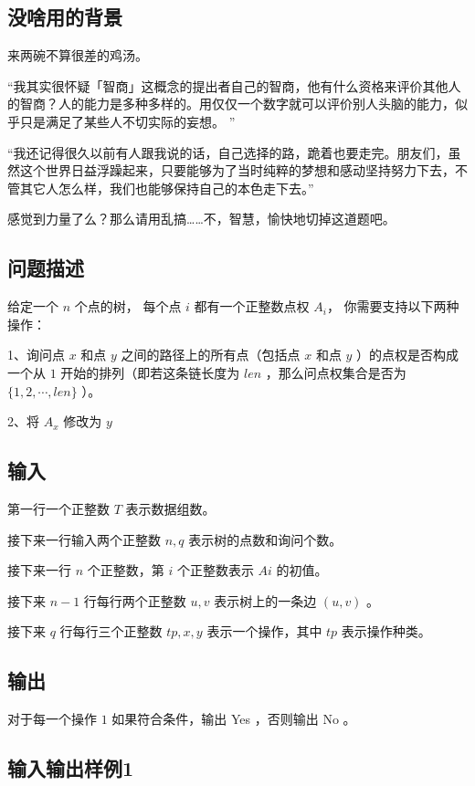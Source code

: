 \documentclass[UTF8]{ctexart}
\begin{document}
\subsection{没啥用的背景}

来两碗不算很差的鸡汤。

“我其实很怀疑「智商」这概念的提出者自己的智商，他有什么资格来评价其他人的智商？人的能力是多种多样的。用仅仅一个数字就可以评价别人头脑的能力，似乎只是满足了某些人不切实际的妄想。
”

“我还记得很久以前有人跟我说的话，自己选择的路，跪着也要走完。朋友们，虽然这个世界日益浮躁起来，只要能够为了当时纯粹的梦想和感动坚持努力下去，不管其它人怎么样，我们也能够保持自己的本色走下去。”

感觉到力量了么？那么请用乱搞……不，智慧，愉快地切掉这道题吧。

\subsection{问题描述}

给定一个 $n$ 个点的树， 每个点 $i$ 都有一个正整数点权 $A_i$， 你需要支持以下两种操作：

1、询问点 $x$ 和点 $y$ 之间的路径上的所有点（包括点 $x$ 和点 $y$ ）的点权是否构成一个从 $1$ 开始的排列（即若这条链长度为 $len$ ，那么问点权集合是否为 $\lbrace 1,2,\cdots,len\rbrace$ ）。

2、将 $A_x$ 修改为 $y$

\subsection{输入}

第一行一个正整数 $T$ 表示数据组数。

接下来一行输入两个正整数 $n,q$ 表示树的点数和询问个数。

接下来一行 $n$ 个正整数，第 $i$ 个正整数表示 $Ai$ 的初值。

接下来 $n−1$ 行每行两个正整数 $u,v$ 表示树上的一条边 $(u,v)$ 。

接下来 $q$ 行每行三个正整数 $tp,x,y$ 表示一个操作，其中 $tp$ 表示操作种类。

\subsection{输出}

对于每一个操作 $1$ 如果符合条件，输出 Yes ，否则输出 No 。

\subsection{输入输出样例1}
\end{document}

